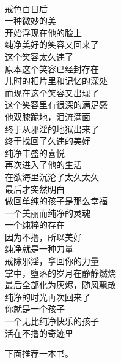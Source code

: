 \begin{poem}
    \begin{multicols}{2}
        \centering~\\
        戒色百日后 \\ 一种微妙的美 \\ 开始浮现在他的脸上 \\ 纯净美好的笑容又回来了 \\ 这个笑容太久违了 \\ 原本这个笑容已经封存在 \\ 儿时的相片里和记忆的深处 \\ 而现在这个笑容又出现了 \\ 这个笑容里有很深的满足感 \\ 他双膝跪地，泪流满面 \\ 终于从邪淫的地狱出来了 \\ 终于找回了久违的美好 \\ 纯净丰盛的喜悦 \\ 再次进入了他的生活 \\ 在欲海里沉沦了太久太久 \\ 最后才突然明白 \\ 做回单纯的孩子是那么幸福 \\ 一个美丽而纯净的灵魂 \\ 一个纯粹的存在 \\ 因为不撸，所以美好 \\ 纯净就是一种力量 \\ 戒除邪淫，拿回你的力量 \\ 掌中，堕落的岁月在静静燃烧 \\ 最后全部化为灰烬，随风飘散 \\ 纯净的时光再次回来了 \\ 你就是一个孩子 \\ 一个无比纯净快乐的孩子 \\ 活在不撸的奇迹里
    \end{multicols}
\end{poem}

下面推荐一本书。

